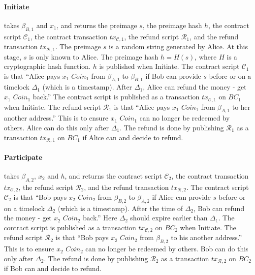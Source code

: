 \paragraph{Initiate}
takes $\beta_{B, 1}$ and $x_1$,
and returns the preimage $s$, the preimage hash $h$, the contract script $\mathcal{C}_1$, the contract transaction $tx_{\mathcal{C}, 1}$, the refund script $\mathcal{R}_1$, and the refund transaction $tx_{\mathcal{R}, 1}$.
The preimage $s$ is a random string generated by Alice. At this stage, $s$ is only known to Alice.
The preimage hash $h = H(s)$, where $H$ is a cryptographic hash function.  $h$ is published when Initiate.
The contract script $\mathcal{C}_1$ is that ``Alice pays $x_1$ $Coin_1$ from $\beta_{A, 1}$ to $\beta_{B, 1}$ if Bob can provide $s$ before or on a timelock $\Delta_1$ (which is a timestamp). After $\Delta_1$, Alice can refund the money - get $x_1$ $Coin_1$ back.''
The contract script is published as a transaction $tx_{\mathcal{C}, 1}$ on $BC_1$ when Initiate.
The refund script $\mathcal{R}_1$ is that ``Alice pays $x_1$ $Coin_1$ from $\beta_{A, 1}$ to her another address.'' This is to ensure $x_1$ $Coin_1$ can no longer be redeemed by others. Alice can do this only after $\Delta_1$.
The refund is done by publishing $\mathcal{R}_1$ as a transaction $tx_{\mathcal{R}, 1}$ on $BC_1$ if Alice can and decide to refund.

\paragraph{Participate}
takes $\beta_{A, 2}$, $x_2$ and $h$,
and returns the contract script $\mathcal{C}_2$, the contract transaction $tx_{\mathcal{C}, 2}$, the refund script $\mathcal{R}_2$, and the refund transaction $tx_{\mathcal{R}, 2}$.
The contract script $\mathcal{C}_2$ is that ``Bob pays $x_2$ $Coin_2$ from $\beta_{B, 2}$ to $\beta_{A, 2}$ if Alice can provide $s$ before or on a timelock $\Delta_2$ (which is a timestamp). After the time of $\Delta_2$, Bob can refund the money - get $x_2$ $Coin_2$ back.''
Here $\Delta_2$ should expire earlier than $\Delta_1$.
The contract script is published as a transaction $tx_{\mathcal{C}, 2}$ on $BC_2$ when Initiate.
The refund script $\mathcal{R}_2$ is that ``Bob pays $x_2$ $Coin_2$ from $\beta_{B, 2}$ to his another address.'' This is to ensure $x_2$ $Coin_2$ can no longer be redeemed by others. Bob can do this only after $\Delta_2$.
The refund is done by publishing $\mathcal{R}_2$ as a transaction $tx_{\mathcal{R}, 2}$ on $BC_2$ if Bob can and decide to refund.

